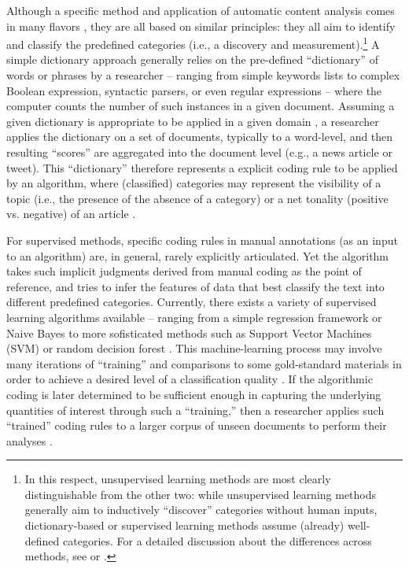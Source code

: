 \documentclass[man, 12pt, a4paper, nolmodern, noextraspace]{apa6}
\begin{document}
    Although a specific method and application of automatic content analysis comes in many flavors \parencites[for a broad overview, see:][]{Boumans_Trilling_2016, grimmer2013text}, they are all based on similar principles: they all aim to identify and classify the predefined categories (i.e., a discovery and measurement).\footnote{In this respect, unsupervised learning methods are most clearly distinguishable from the other two: while unsupervised learning methods generally aim to inductively \enquote{discover} categories without human inputs, dictionary-based or supervised learning methods assume (already) well-defined categories. For a detailed discussion about the differences across methods, see \textcite{grimmer2013text} or \textcite{Boumans_Trilling_2016}.} A simple dictionary approach generally relies on the pre-defined “dictionary” of words or phrases by a researcher -- ranging from simple keywords lists to complex Boolean expression, syntactic parsers, or even regular expressions -- where the computer counts the number of such instances in a given document. Assuming a given dictionary is appropriate to be applied in a given domain \parencite{Boumans_Trilling_2016, gonzalez2015signals}, a researcher applies the dictionary on a set of documents, typically to a word-level, and then resulting \enquote{scores} are aggregated into the document level (e.g., a news article or tweet). This \enquote{dictionary} therefore represents a explicit coding rule to be applied by an algorithm, where (classified) categories may represent the visibility of a topic (i.e., the presence of the absence of a category) or a net tonality (positive vs. negative) of an article \parencites[e.g.,][]{Aaldering2016, YoungSoroka2012, boomgaaden2009, gonzalez2015signals, Rooduijn2011}. 
    
    For supervised methods, specific coding rules in manual annotations (as an input to an algorithm) are, in general, rarely explicitly articulated. Yet the algorithm takes such implicit judgments derived from manual coding as the point of reference, and tries to infer the features of data that best classify the text into different predefined categories. Currently, there exists a variety of supervised learning algorithms available -- ranging from a simple regression framework or Naive Bayes to more sofisticated methods such as Support Vector Machines (SVM) or random decision forest \parencites[for an overview of different algorithms commonly used in social science applications, see][]{hindman2015building}. This machine-learning process may involve many iterations of \enquote{training} and comparisons to some gold-standard materials in order to achieve a desired level of a classification quality \parencites[e.g.,][]{scharkow2013thematic}. If the algorithmic coding is later determined to be sufficient enough in capturing the underlying quantities of interest through such a \enquote{training,} then a researcher applies such \enquote{trained} coding rules to a larger corpus of unseen documents to perform their analyses \parencites[e.g.,][]{burscher2015using, burscher2014teaching, scharkow2013thematic, gonzalez2015signals}.    
    
\end{document}
